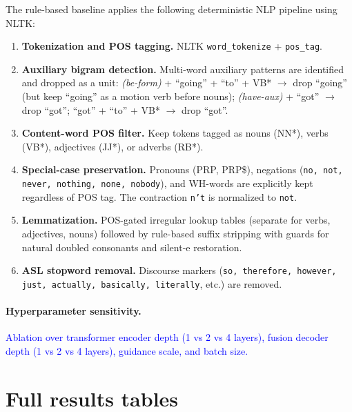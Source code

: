 \documentclass{article}
\newcommand{\placeholder}[1]{\textcolor{blue}{#1}}
\begin{document}
The rule-based baseline applies the following deterministic NLP pipeline using NLTK:

\begin{enumerate}
    \item \textbf{Tokenization and POS tagging.} NLTK \texttt{word\_tokenize} + \texttt{pos\_tag}.
    \item \textbf{Auxiliary bigram detection.} Multi-word auxiliary patterns are identified and dropped as a unit:
    \emph{(be-form)} + ``going'' + ``to'' + VB* $\to$ drop ``going'' (but keep ``going'' as a motion verb before nouns);
    \emph{(have-aux)} + ``got'' $\to$ drop ``got'';
    ``got'' + ``to'' + VB* $\to$ drop ``got''.
    \item \textbf{Content-word POS filter.} Keep tokens tagged as nouns (NN*), verbs (VB*), adjectives (JJ*), or adverbs (RB*).
    \item \textbf{Special-case preservation.} Pronouns (PRP, PRP\$), negations (\texttt{no, not, never, nothing, none, nobody}), and WH-words are explicitly kept regardless of POS tag. The contraction \texttt{n't} is normalized to \texttt{not}.
    \item \textbf{Lemmatization.} POS-gated irregular lookup tables (separate for verbs, adjectives, nouns) followed by rule-based suffix stripping with guards for natural doubled consonants and silent-e restoration.
    \item \textbf{ASL stopword removal.} Discourse markers (\texttt{so, therefore, however, just, actually, basically, literally}, etc.) are removed.
\end{enumerate}

\paragraph{Hyperparameter sensitivity.}
\placeholder{Ablation over transformer encoder depth (1 vs 2 vs 4 layers), fusion decoder depth (1 vs 2 vs 4 layers), guidance scale, and batch size.}

\section{Full results tables}
\label{app:full_tables}
\end{document}

